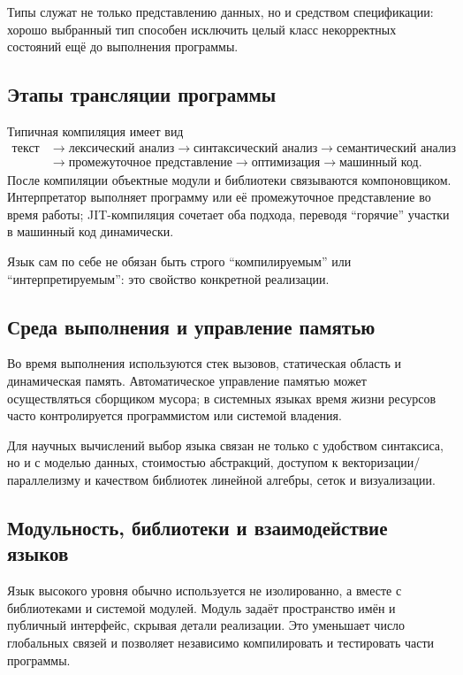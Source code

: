 Типы служат не только представлению данных, но и средством спецификации:
хорошо выбранный тип способен исключить целый класс некорректных состояний ещё
до выполнения программы.

\subsection{Этапы трансляции программы}

Типичная компиляция имеет вид
\[
\begin{aligned}
\text{текст}&\rightarrow\text{лексический анализ}
\rightarrow\text{синтаксический анализ}
\rightarrow\text{семантический анализ}\\
&\rightarrow\text{промежуточное представление}
\rightarrow\text{оптимизация}
\rightarrow\text{машинный код}.
\end{aligned}
\]
После компиляции объектные модули и библиотеки связываются компоновщиком.
Интерпретатор выполняет программу или её промежуточное представление во время
работы; JIT-компиляция сочетает оба подхода, переводя ``горячие'' участки в
машинный код динамически.

Язык сам по себе не обязан быть строго ``компилируемым'' или
``интерпретируемым'': это свойство конкретной реализации.

\subsection{Среда выполнения и управление памятью}

Во время выполнения используются стек вызовов, статическая область и динамическая
память. Автоматическое управление памятью может осуществляться сборщиком мусора;
в системных языках время жизни ресурсов часто контролируется программистом или
системой владения.

Для научных вычислений выбор языка связан не только с удобством синтаксиса, но и
с моделью данных, стоимостью абстракций, доступом к векторизации/параллелизму и
качеством библиотек линейной алгебры, сеток и визуализации.



\subsection{Модульность, библиотеки и взаимодействие языков}

Язык высокого уровня обычно используется не изолированно, а вместе с
библиотеками и системой модулей. Модуль задаёт пространство имён и публичный
интерфейс, скрывая детали реализации. Это уменьшает число глобальных связей и
позволяет независимо компилировать и тестировать части программы.

